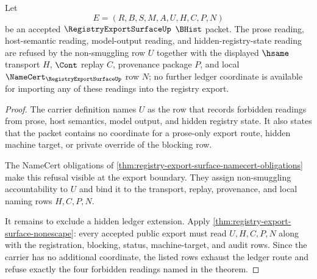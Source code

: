 \begin{theorem}
\label{thm:registry-export-surface-nonsmuggling-ledger-exhaustion}
Let
$$
E=(R,B,S,M,A,U,H,C,P,N)
$$
be an accepted $\RegistryExportSurfaceUp$ $\BHist$ packet. The prose reading, host-semantic reading, model-output reading, and hidden-registry-state reading are refused by the non-smuggling row $U$ together with the displayed $\hsame$ transport $H$, $\Cont$ replay $C$, provenance package $P$, and local $\NameCert_{\RegistryExportSurfaceUp}$ row $N$; no further ledger coordinate is available for importing any of these readings into the registry export.
\end{theorem}
\begin{proof}
The carrier definition names $U$ as the row that records forbidden readings from prose, host semantics, model output, and hidden registry state. It also states that the packet contains no coordinate for a prose-only export route, hidden machine target, or private override of the blocking row.

The NameCert obligations of \autoref{thm:registry-export-surface-namecert-obligations} make this refusal visible at the export boundary. They assign non-smuggling accountability to $U$ and bind it to the transport, replay, provenance, and local naming rows $H,C,P,N$.

It remains to exclude a hidden ledger extension. Apply \autoref{thm:registry-export-surface-nonescape}: every accepted public export must read $U,H,C,P,N$ along with the registration, blocking, status, machine-target, and audit rows. Since the carrier has no additional coordinate, the listed rows exhaust the ledger route and refuse exactly the four forbidden readings named in the theorem.
\end{proof}

